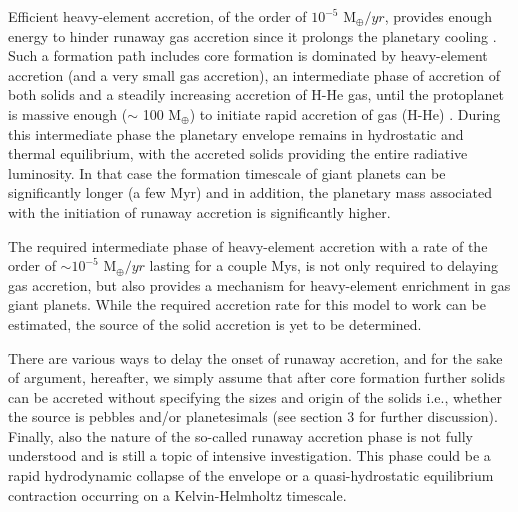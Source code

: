 \documentclass{aa}
\begin{document}
Efficient heavy-element accretion, of the order of $10^{-5}$ M$_{\oplus}/yr$,  
provides enough energy to hinder runaway gas accretion since it prolongs the planetary cooling \citep[e.g.,][]{2018NatAs...2..873A,Venturini2020,2023arXiv230412788K}.  Such a formation path includes core formation is dominated by heavy-element accretion (and a very small gas accretion), an intermediate phase of accretion of both solids and a steadily increasing accretion of H-He gas, until the protoplanet is massive enough ($\sim$ 100 M$_{\oplus}$) to initiate rapid accretion of gas (H-He) \citep[e.g.,][]{2022Icar..37814937H}. 
 During this intermediate phase the planetary envelope remains in 
hydrostatic and thermal equilibrium, with the accreted solids providing the entire radiative luminosity. 
In that case the formation timescale of giant planets can be significantly longer (a few Myr) and in addition, the planetary mass associated with the initiation of runaway accretion is significantly higher.  

The required intermediate phase of heavy-element accretion with a rate of the order of $\sim10^{-5}$ M$_{\oplus}/yr$ lasting for a couple Mys, is not only required to delaying gas accretion, but also provides a mechanism for heavy-element enrichment in gas giant planets. 
While the required accretion rate for this model to work  can be estimated, the source of the solid accretion is yet to be determined.  
\par 


There are various ways to delay the onset of runaway accretion, and for the sake of argument, hereafter, we simply assume that after core formation further solids can be accreted without specifying the sizes and origin of the solids  i.e., whether the source is pebbles and/or planetesimals (see section 3 for further discussion).  
Finally, also the nature of the so-called runaway accretion phase is not fully understood and is still a topic of intensive investigation.
This phase could be a rapid hydrodynamic collapse of
the envelope or a quasi-hydrostatic equilibrium contraction occurring on a  Kelvin-Helmholtz timescale. 
\end{document}

